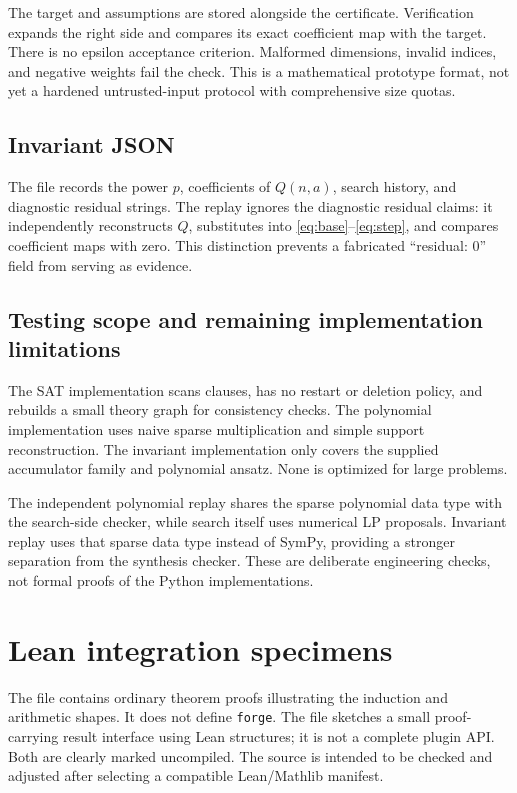 \documentclass[11pt,letterpaper]{article}
\newcommand{\code}[1]{\texttt{\detokenize{#1}}}
\newcommand{\forge}{\texttt{forge}}
\theoremstyle{definition}\newtheorem{definition}[proposition]{Definition}
\begin{document}
The target and assumptions are stored alongside the certificate. Verification expands the right side and compares its exact coefficient map with the target. There is no epsilon acceptance criterion. Malformed dimensions, invalid indices, and negative weights fail the check. This is a mathematical prototype format, not yet a hardened untrusted-input protocol with comprehensive size quotas.

\subsection{Invariant JSON}
The file records the power $p$, coefficients of $Q(n,a)$, search history, and diagnostic residual strings. The replay ignores the diagnostic residual claims: it independently reconstructs $Q$, substitutes into \eqref{eq:base}--\eqref{eq:step}, and compares coefficient maps with zero. This distinction prevents a fabricated ``residual: 0'' field from serving as evidence.

\subsection{Testing scope and remaining implementation limitations}
The SAT implementation scans clauses, has no restart or deletion policy, and rebuilds a small theory graph for consistency checks. The polynomial implementation uses naive sparse multiplication and simple support reconstruction. The invariant implementation only covers the supplied accumulator family and polynomial ansatz. None is optimized for large problems.

The independent polynomial replay shares the sparse polynomial data type with the search-side checker, while search itself uses numerical LP proposals. Invariant replay uses that sparse data type instead of SymPy, providing a stronger separation from the synthesis checker. These are deliberate engineering checks, not formal proofs of the Python implementations.

\section{Lean integration specimens}
The file \code{lean/Examples.lean} contains ordinary theorem proofs illustrating the induction and arithmetic shapes. It does not define \forge{}. The file \code{lean/Contracts.lean} sketches a small proof-carrying result interface using Lean structures; it is not a complete plugin API. Both are clearly marked uncompiled. The source is intended to be checked and adjusted after selecting a compatible Lean/Mathlib manifest.
\end{document}
